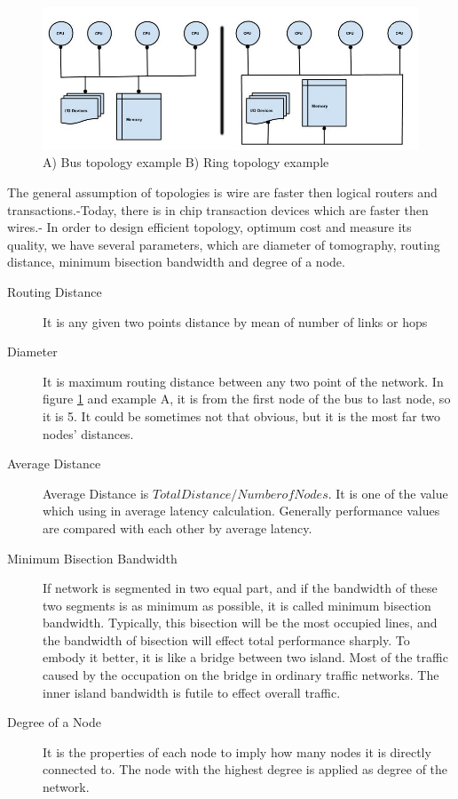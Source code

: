             \begin{figure}[h!]
                \centering
                \includegraphics[width=1\textwidth]{img/busandring.jpg}
                \caption{A) Bus topology example B) Ring topology example}
                \label{fig:busring}
            \end{figure}
            The general assumption of topologies is wire are faster then logical routers and transactions.-Today, there is in chip transaction devices which are faster then wires\cite{hennessy2012computer}.- In order to design efficient topology, optimum cost and measure its quality, we have several parameters, which are diameter of tomography, routing distance, minimum bisection bandwidth and degree of a node.
            \begin{description}
              \item[Routing Distance] It is any given two points distance by mean of number of links or hops
              \item[Diameter] It is maximum routing distance between any two point of the network. In figure \ref{fig:busring} and example A, it is from the first node of the bus to last node, so it is 5. It could be sometimes not that obvious, but it is the most far two nodes' distances.
              \item[Average Distance] Average Distance is $TotalDistance/NumberofNodes$. It is one of the value which using in average latency calculation. Generally performance values are compared with each other by average latency.
              \item[Minimum Bisection Bandwidth] If network is segmented in two equal part, and if the bandwidth of these two segments is as minimum as possible, it is called minimum bisection bandwidth. Typically, this bisection will be the most occupied lines, and the bandwidth of bisection will effect total performance sharply. To embody it better, it is like a bridge between two island. Most of the traffic caused by the occupation on the bridge in ordinary traffic networks. The inner island bandwidth is futile to effect overall traffic.
              \item[Degree of a Node] It is the properties of each node to imply how many nodes it is directly connected to. The node with the highest degree is applied as degree of the network.
          \end{description}
